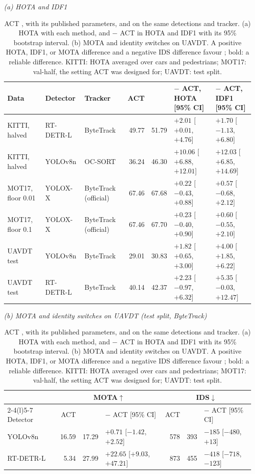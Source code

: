 \begin{table}[!tp]
\caption{ACT \cite{act2026adaptive}, with its published parameters, and \scl{} on the same detections and tracker. (a) HOTA with each method, and \scl{} $-$ ACT in HOTA and IDF1 with its 95\% bootstrap interval. (b) MOTA and identity switches on UAVDT. A positive HOTA, IDF1, or MOTA difference and a negative IDS difference favour \scl{}; bold: a reliable difference. KITTI: HOTA averaged over cars and pedestrians; MOT17: val-half, the setting ACT was designed for; UAVDT: test split.}
\label{tab:act}
\centering\footnotesize
\setlength{\tabcolsep}{3pt}
{\textit{(a) HOTA and IDF1}}\par\smallskip
\begin{tabular}{@{}lllrrll@{}}
\toprule
Data & Detector & Tracker & ACT & \scl{} & \scl{} $-$ ACT, HOTA [95\% CI] & \scl{} $-$ ACT, IDF1 [95\% CI]\\
\midrule
KITTI, halved & RT-DETR-L & ByteTrack & 49.77 & 51.79 & {\boldmath $+2.01$ [$+0.01$, $+4.76$]} & $+1.70$ [$-1.13$, $+6.80$]\\
KITTI, halved & YOLOv8n & OC-SORT & 36.24 & 46.30 & {\boldmath $+10.06$ [$+6.88$, $+12.01$]} & {\boldmath $+12.03$ [$+6.85$, $+14.69$]}\\
\addlinespace[2pt]
MOT17, floor 0.01 & YOLOX-X & ByteTrack (official) & 67.46 & 67.68 & $+0.22$ [$-0.43$, $+0.88$] & $+0.57$ [$-0.68$, $+2.12$]\\
MOT17, floor 0.1 & YOLOX-X & ByteTrack (official) & 67.46 & 67.70 & $+0.23$ [$-0.40$, $+0.90$] & $+0.60$ [$-0.55$, $+2.10$]\\
\addlinespace[2pt]
UAVDT test & YOLOv8n & ByteTrack & 29.01 & 30.83 & {\boldmath $+1.82$ [$+0.65$, $+3.00$]} & {\boldmath $+4.00$ [$+1.85$, $+6.22$]}\\
UAVDT test & RT-DETR-L & ByteTrack & 40.14 & 42.37 & $+2.23$ [$-0.97$, $+6.32$] & $+5.35$ [$-0.03$, $+12.47$]\\
\bottomrule
\end{tabular}

\medskip
{\textit{(b) MOTA and identity switches on UAVDT (test split, ByteTrack)}}\par\smallskip
\begin{tabular}{@{}lrrlrrl@{}}
\toprule
 & \multicolumn{3}{c}{MOTA$\uparrow$} & \multicolumn{3}{c}{IDS$\downarrow$}\\
\cmidrule(lr){2-4}\cmidrule(l){5-7}
Detector & ACT & \scl{} & \scl{} $-$ ACT [95\% CI] & ACT & \scl{} & \scl{} $-$ ACT [95\% CI]\\
\midrule
YOLOv8n & 16.59 & 17.29 & $+0.71$ [$-1.42$, $+2.52$] & 578 & 393 & $-185$ [$-480$, $+13$]\\
RT-DETR-L & 5.34 & 27.99 & {\boldmath $+22.65$ [$+9.03$, $+47.21$]} & 873 & 455 & {\boldmath $-418$ [$-718$, $-123$]}\\
\bottomrule
\end{tabular}
\end{table}
